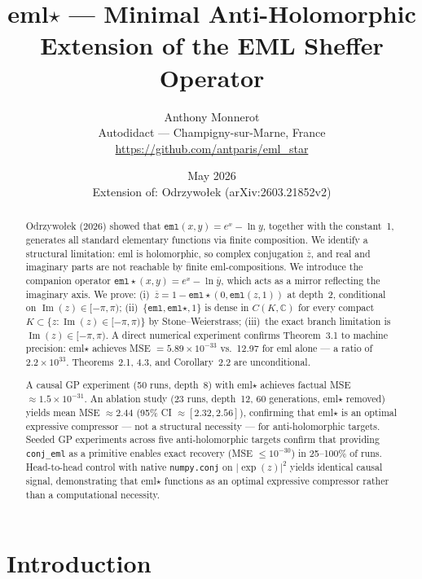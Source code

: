 \documentclass[11pt,a4paper]{article}
\title{\textbf{eml$\star$ --- Minimal Anti-Holomorphic Extension of the EML Sheffer Operator}}
\author{Anthony Monnerot \\ Autodidact --- Champigny-sur-Marne, France \\ \url{https://github.com/antparis/eml_star}}
\date{May 2026 \\ Extension of: Odrzywołek (arXiv:2603.21852v2)}
\begin{document}
\maketitle

\begin{abstract}
Odrzywołek (2026) showed that $\texttt{eml}(x, y) = e^x - \ln y$, together with the constant~1, generates all standard elementary functions via finite composition. We identify a structural limitation: eml is holomorphic, so complex conjugation $\overline{z}$, and real and imaginary parts are not reachable by finite eml-compositions. We introduce the companion operator $\texttt{eml}\star(x, y) = e^x - \ln \overline{y}$, which acts as a mirror reflecting the imaginary axis. We prove: (i)~$\overline{z} = 1 - \texttt{eml}\star(0, \texttt{eml}(z, 1))$ at depth~2, conditional on $\operatorname{Im}(z) \in [-\pi, \pi)$; (ii)~$\{\texttt{eml}, \texttt{eml}\star, 1\}$ is dense in $C(K, \mathbb{C})$ for every compact $K \subset \{z : \operatorname{Im}(z) \in [-\pi, \pi)\}$ by Stone--Weierstrass; (iii)~the exact branch limitation is $\operatorname{Im}(z) \in [-\pi, \pi)$. A direct numerical experiment confirms Theorem~3.1 to machine precision: eml$\star$ achieves MSE $= 5.89 \times 10^{-33}$ vs.\ 12.97 for eml alone --- a ratio of $2.2 \times 10^{33}$. Theorems~2.1, 4.3, and Corollary~2.2 are unconditional.

A causal GP experiment (50 runs, depth~8) with eml$\star$ achieves factual MSE $\approx 1.5 \times 10^{-31}$. An ablation study (23 runs, depth~12, 60 generations, eml$\star$ removed) yields mean MSE $\approx 2.44$ (95\% CI $\approx [2.32, 2.56]$), confirming that eml$\star$ is an optimal expressive compressor --- not a structural necessity --- for anti-holomorphic targets. Seeded GP experiments across five anti-holomorphic targets confirm that providing \texttt{conj\_eml} as a primitive enables exact recovery (MSE $\leq 10^{-30}$) in 25--100\% of runs. Head-to-head control with native \texttt{numpy.conj} on $|\exp(z)|^2$ yields identical causal signal, demonstrating that eml$\star$ functions as an optimal expressive compressor rather than a computational necessity.
\end{abstract}

\section{Introduction}
\end{document}
